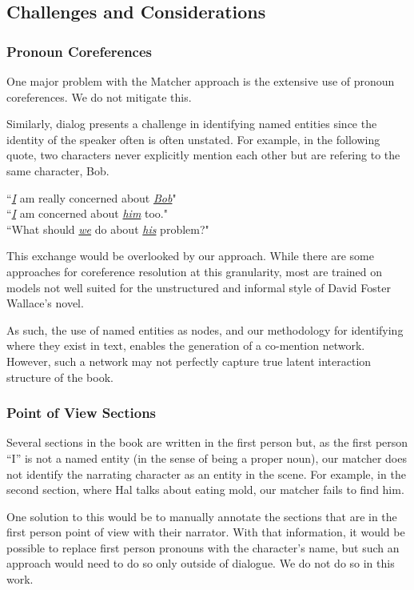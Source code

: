 \subsection{Challenges and Considerations} \label{challenges-and-considerations}

\subsubsection{Pronoun Coreferences}
One major problem with the Matcher approach is the extensive use of pronoun coreferences. We do not mitigate this.

Similarly, dialog presents a challenge in identifying named entities since the identity of the speaker often is often unstated. For example, in the following quote, two characters never explicitly mention each other but are refering to the same character, Bob.

\begin{displayquote}
``\emph{\underline{I}} am really concerned about \emph{\underline{Bob}}"\\
``\emph{\underline{I}} am concerned about \emph{\underline{him}} too."\\
``What should \underline{\emph{we}} do about \underline{\emph{his}} problem?"
\end{displayquote}

This exchange would be overlooked by our approach. While there are some approaches for coreference resolution at this granularity, most are trained on models not well suited for the unstructured and informal style of David Foster Wallace's novel. 

As such, the use of named entities as nodes, and our methodology for identifying where they exist in text, enables the generation of a co-mention network. However, such a network may not perfectly capture true latent interaction structure of the book.

\subsubsection{Point of View Sections}
Several sections in the book are written in the first person but, as the first person ``I'' is not a named entity (in the sense of being a proper noun), our matcher does not identify the narrating character as an entity in the scene. For example, in the second section, where Hal talks about eating mold, our matcher fails to find him.

One solution to this would be to manually annotate the sections that are in the first person point of view with their narrator. With that information, it would be possible to replace first person pronouns with the character's name, but such an approach would need to do so only outside of dialogue. We do not do so in this work.

